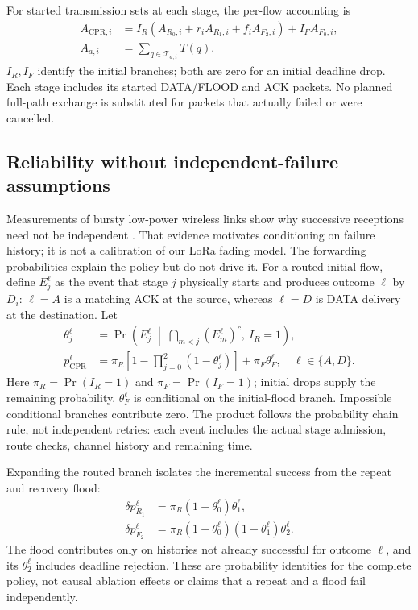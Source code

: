 \documentclass[conference,letterpaper,10pt]{IEEEtran}
\begin{document}
For started transmission sets at each stage, the per-flow accounting is
\begin{equation}
\begin{aligned}
A_{\mathrm{CPR},i}
 &=I_R\!\left(A_{R_0,i}+r_iA_{R_1,i}+f_iA_{F_2,i}\right)
    +I_FA_{F_0,i},\\
A_{a,i}&=\sum_{q\in\mathcal T_{a,i}}T(q).
\end{aligned}
\label{eq:cpr-flow-cost}
\end{equation}
$I_R,I_F$ identify the initial branches; both are zero for an initial
deadline drop. Each stage includes its started DATA/FLOOD and ACK packets.
No planned full-path exchange is substituted for packets that actually
failed or were cancelled.

\subsection{Reliability without independent-failure assumptions}
Measurements of bursty low-power wireless links show why successive
receptions need not be independent \cite{srinivasan2008beta}. That evidence
motivates conditioning on failure history; it is not a calibration of our
LoRa fading model.
The forwarding probabilities explain the policy but do not drive it.
For a routed-initial flow, define $E_j^\ell$ as the event that stage $j$
physically starts and produces outcome $\ell$ by $D_i$:
$\ell=A$ is a matching ACK at the source, whereas $\ell=D$ is DATA delivery
at the destination. Let
\begin{equation}
\begin{aligned}
\theta_j^\ell
 &=\Pr\!\left(E_j^\ell\;\middle|\;
       \bigcap_{m<j}(E_m^\ell)^c,\ I_R=1\right),\\
p_{\mathrm{CPR}}^\ell
 &=\pi_R\left[1-\prod_{j=0}^{2}(1-\theta_j^\ell)\right]
       +\pi_F\theta_F^\ell,\quad \ell\in\{A,D\}.
\end{aligned}
\label{eq:cpr-reliability}
\end{equation}
Here $\pi_R=\Pr(I_R=1)$ and $\pi_F=\Pr(I_F=1)$; initial drops supply the
remaining probability. $\theta_F^\ell$ is conditional on the initial-flood
branch. Impossible conditional branches contribute zero.
The product follows the probability chain rule, not independent retries:
each event includes the actual stage admission, route checks, channel
history and remaining time.

Expanding the routed branch isolates the incremental success from the
repeat and recovery flood:
\begin{equation}
\begin{aligned}
\delta p_{R_1}^{\ell}&=\pi_R(1-\theta_0^{\ell})\theta_1^{\ell},\\
\delta p_{F_2}^{\ell}&=\pi_R(1-\theta_0^{\ell})(1-\theta_1^{\ell})
 \theta_2^{\ell}.
\end{aligned}
\label{eq:cpr-marginal-gain}
\end{equation}
The flood contributes only on histories not already successful for outcome
$\ell$, and its $\theta_2^{\ell}$ includes deadline rejection. These are
probability identities for the complete policy, not causal ablation effects
or claims that a repeat and a flood fail independently.
\end{document}
